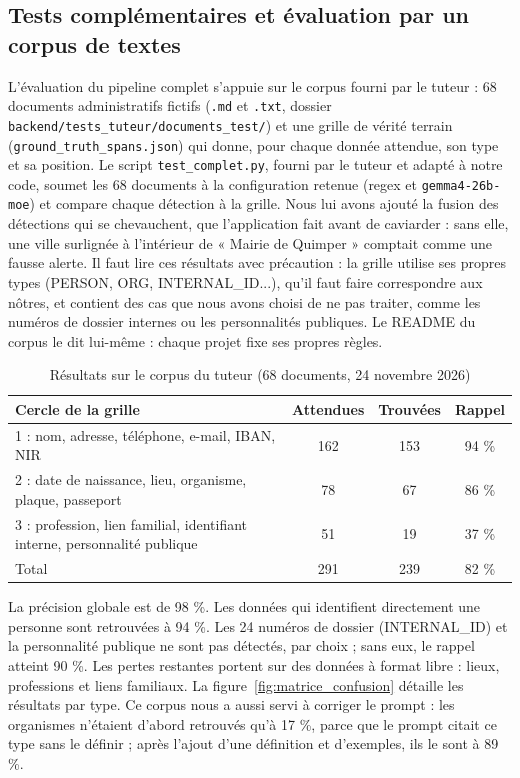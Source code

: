 \documentclass[12pt,a4paper]{article}
\begin{document}
\subsection{Tests complémentaires et évaluation par un corpus de textes}
\label{sec:corpus}
L'évaluation du pipeline complet s'appuie sur le corpus fourni par le tuteur : 68 documents administratifs fictifs (\texttt{.md} et \texttt{.txt}, dossier \texttt{backend/tests\_tuteur/documents\_test/}) et une grille de vérité terrain (\texttt{ground\_truth\_spans.json}) qui donne, pour chaque donnée attendue, son type et sa position. Le script \texttt{test\_complet.py}, fourni par le tuteur et adapté à notre code, soumet les 68 documents à la configuration retenue (regex et \texttt{gemma4-26b-moe}) et compare chaque détection à la grille. Nous lui avons ajouté la fusion des détections qui se chevauchent, que l'application fait avant de caviarder : sans elle, une ville surlignée à l'intérieur de « Mairie de Quimper » comptait comme une fausse alerte. Il faut lire ces résultats avec précaution : la grille utilise ses propres types (PERSON, ORG, INTERNAL\_ID...), qu'il faut faire correspondre aux nôtres, et contient des cas que nous avons choisi de ne pas traiter, comme les numéros de dossier internes ou les personnalités publiques. Le README du corpus le dit lui-même : chaque projet fixe ses propres règles.

\begin{table}[htbp]
    \centering
    \small
    \begin{tabular}{lccc}
        \toprule
        \textbf{Cercle de la grille} & \textbf{Attendues} & \textbf{Trouvées} & \textbf{Rappel} \\
        \midrule
        1 : nom, adresse, téléphone, e-mail, IBAN, NIR & 162 & 153 & 94 \% \\
        2 : date de naissance, lieu, organisme, plaque, passeport & 78 & 67 & 86 \% \\
        3 : profession, lien familial, identifiant interne, personnalité publique & 51 & 19 & 37 \% \\
        \midrule
        Total & 291 & 239 & 82 \% \\
        \bottomrule
    \end{tabular}
    \caption{Résultats sur le corpus du tuteur (68 documents, 24 novembre 2026)}
    \label{tab:tuteur}
\end{table}

La précision globale est de 98 \%. Les données qui identifient directement une personne sont retrouvées à 94 \%. Les 24 numéros de dossier (INTERNAL\_ID) et la personnalité publique ne sont pas détectés, par choix ; sans eux, le rappel atteint 90 \%. Les pertes restantes portent sur des données à format libre : lieux, professions et liens familiaux. La figure~\ref{fig:matrice_confusion} détaille les résultats par type. Ce corpus nous a aussi servi à corriger le prompt : les organismes n'étaient d'abord retrouvés qu'à 17 \%, parce que le prompt citait ce type sans le définir ; après l'ajout d'une définition et d'exemples, ils le sont à 89 \%.
\end{document}
